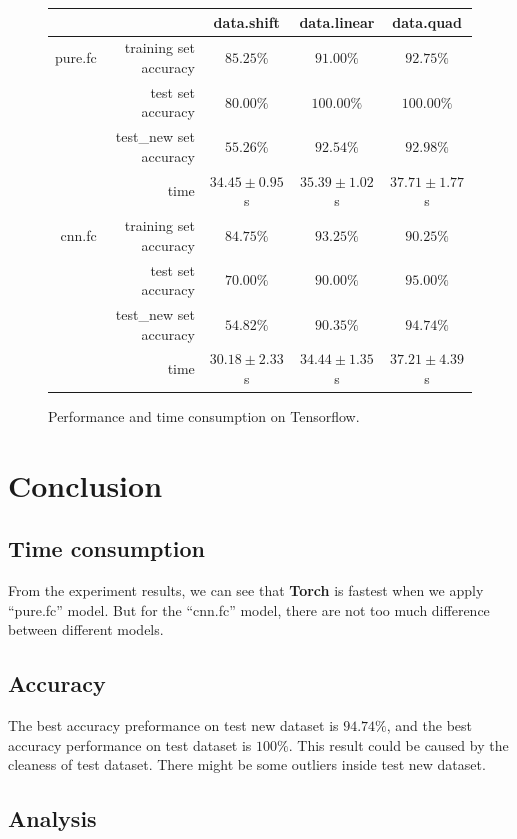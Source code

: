 \documentclass[a4paper]{article}
\begin{document}
\begin{figure}[H]
\centering
\begin{tabular}{|r|r|c|c|c|}
\hline
 & & data.shift & data.linear & data.quad \\
\hline
pure.fc & training set accuracy & $85.25\%$ & $91.00\%$ & $92.75\%$ \\
 & test set accuracy & $80.00\%$ & $\mathbf{100.00\%}$ & $\mathbf{100.00\%}$ \\
 & test\_new set accuracy & $55.26\%$ & $92.54\%$ & $92.98\%$ \\
 & time & $34.45\pm0.95$s & $35.39\pm1.02$s & $37.71\pm1.77$s \\
\hline
cnn.fc & training set accuracy & $84.75\%$ & $93.25\%$ & $90.25\%$ \\
 & test set accuracy & $70.00\%$ & $90.00\%$ & $95.00\%$ \\
 & test\_new set accuracy & $54.82\%$ & $90.35\%$ & $\mathbf{94.74\%}$ \\
 & time & $30.18\pm2.33$s & $34.44\pm1.35$s & $37.21\pm4.39$s \\
\hline
\end{tabular}
\caption{Performance and time consumption on Tensorflow.}
\end{figure}

\section{Conclusion}

\subsection{Time consumption}

From the experiment results, we can see that \textbf{Torch} is fastest when we apply ``pure.fc'' model. But for the ``cnn.fc'' model, there are not too much difference between different models.

\subsection{Accuracy}

The best accuracy preformance on test new dataset is $94.74\%$, and the best accuracy performance on test dataset is $100\%$. This result could be caused by the cleaness of test dataset. There might be some outliers inside test new dataset.

\subsection{Analysis}
\end{document}
